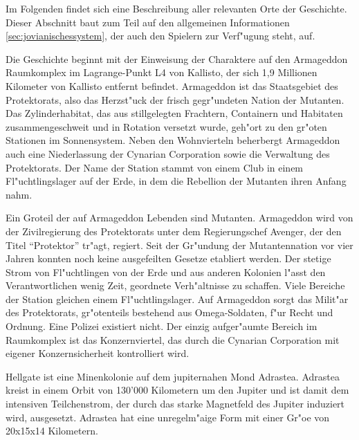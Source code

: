 

Im Folgenden findet sich eine Beschreibung aller relevanten Orte der Geschichte. Dieser Abschnitt baut zum Teil auf den allgemeinen Informationen \cref{sec:jovianischessystem}, der auch den Spielern zur Verf"ugung steht, auf.


Die Geschichte beginnt mit der Einweisung der Charaktere auf den Armageddon Raumkomplex im Lagrange-Punkt L4 von Kallisto, der sich 1,9 Millionen Kilometer von Kallisto entfernt beﬁndet. Armageddon ist das Staatsgebiet des Protektorats, also das Herzst"uck der frisch gegr"undeten Nation der Mutanten. Das Zylinderhabitat, das aus stillgelegten Frachtern, Containern und Habitaten zusammengeschwei\3t und in Rotation versetzt wurde, geh"ort zu den gr"o\3ten Stationen im Sonnensystem. Neben den Wohnvierteln beherbergt Armageddon auch eine Niederlassung der Cynarian Corporation sowie die Verwaltung des Protektorats. Der Name der Station stammt von einem Club in einem Fl"uchtlingslager auf der Erde, in dem die Rebellion der Mutanten ihren Anfang nahm.

Ein Gro\3teil der auf Armageddon Lebenden sind Mutanten. Armageddon wird von der Zivilregierung des Protektorats unter dem Regierungschef Avenger, der den Titel ``Protektor'' tr"agt, regiert. Seit der Gr"undung der Mutantennation vor vier Jahren konnten noch keine ausgefeilten Gesetze etabliert werden. Der stetige Strom von Fl"uchtlingen von der Erde und aus anderen Kolonien l"asst den Verantwortlichen wenig Zeit, geordnete Verh"altnisse zu schaffen. Viele Bereiche der Station gleichen einem Fl"uchtlingslager. Auf Armageddon sorgt das Milit"ar des Protektorats, gr"o\3tenteils bestehend aus Omega-Soldaten, f"ur Recht und Ordnung. Eine Polizei existiert nicht. Der einzig aufger"aumte Bereich im Raumkomplex ist das Konzernviertel, das durch die Cynarian Corporation mit eigener Konzernsicherheit kontrolliert wird.


Hellgate ist eine Minenkolonie auf dem jupiternahen Mond Adrastea. Adrastea kreist in einem Orbit von 130'000 Kilometern um den Jupiter und
ist damit dem intensiven Teilchenstrom, der durch das starke Magnetfeld des Jupiter induziert wird, ausgesetzt. Adrastea hat eine unregelm"a\3ige Form mit einer Gr"o\3e von 20x15x14 Kilometern.

